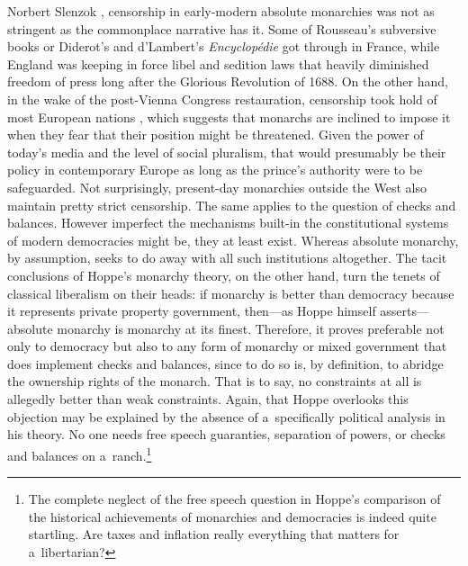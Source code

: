 \begin{artengenv}{Norbert Slenzok}
{%
\parencite*[][pp.114–117]{henshall_myth_2013}, %
 censorship in early-modern absolute monarchies was not as stringent as the commonplace narrative has it. Some of Rousseau's subversive books or Diderot's and d'Lambert's \textit{Encyclopédie} got through in France, while England was keeping in force libel and sedition laws that heavily diminished freedom of press long after the Glorious Revolution of 1688. On the other hand, in the wake of the post-Vienna Congress restauration, censorship took hold of most European nations 
\parencite[][p.208]{henshall_myth_2013}, %
 which suggests that monarchs are inclined to impose it when they fear that their position might be threatened. Given the power of today's media and the level of social pluralism, that would presumably be their policy in contemporary Europe as long as the prince's authority were to be safeguarded. Not surprisingly, present-day monarchies outside the West also maintain pretty strict censorship. } The same applies to the question of checks and balances. However imperfect the mechanisms built-in the constitutional systems of modern democracies might be, they at least exist. Whereas absolute monarchy, by assumption, seeks to do away with all such institutions altogether. The tacit conclusions of Hoppe's monarchy theory, on the other hand, turn the tenets of classical liberalism on their heads: if monarchy is better than democracy because it represents private property government, then---as Hoppe 
\parencite*[][f.9]{hoppe_democracy_2007} %
 himself asserts--- absolute monarchy is monarchy at its finest. Therefore, it proves preferable not only to democracy but also to any form of monarchy or mixed government that does implement checks and balances, since to do so is, by definition, to abridge the ownership rights of the monarch. That is to say, no constraints at all is allegedly better than weak constraints. Again, that Hoppe overlooks this objection may be explained by the absence of a~specifically political analysis in his theory. No one needs free speech guaranties, separation of powers, or checks and balances on a~ranch.\footnote{The complete neglect of the free speech question in Hoppe's 
\parencite*[][pp.50–62]{hoppe_democracy_2007} %
 comparison of the historical achievements of monarchies and democracies is indeed quite startling. Are taxes and inflation really everything that matters for a~libertarian? }




\end{artengenv}
